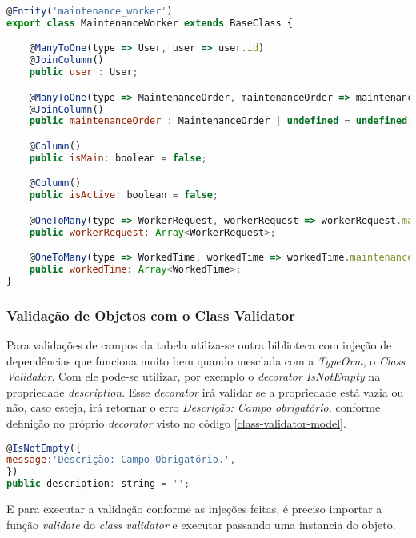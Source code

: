 \begin{lstlisting}[language=JavaScript, caption={Mapeamento de propriedades da tabela maintenance\_worker}, label={model-maintenance-worker}]
@Entity('maintenance_worker')
export class MaintenanceWorker extends BaseClass {

	@ManyToOne(type => User, user => user.id)
	@JoinColumn()
	public user : User;

	@ManyToOne(type => MaintenanceOrder, maintenanceOrder => maintenanceOrder.id, { cascade: false })
	@JoinColumn()
	public maintenanceOrder : MaintenanceOrder | undefined = undefined;

	@Column()
	public isMain: boolean = false;

	@Column()
	public isActive: boolean = false;

	@OneToMany(type => WorkerRequest, workerRequest => workerRequest.maintenanceWorker, { cascade: false })
	public workerRequest: Array<WorkerRequest>;

	@OneToMany(type => WorkedTime, workedTime => workedTime.maintenanceWorker, { cascade: false })
	public workedTime: Array<WorkedTime>;
}
\end{lstlisting}

\subsubsection{Validação de Objetos com o Class Validator}

Para validações de campos da tabela utiliza-se outra biblioteca com injeção de dependências que funciona muito bem quando mesclada com a \textit{TypeOrm}, o \textit{Class Validator}.
Com ele pode-se utilizar, por exemplo o \textit{decorator IsNotEmpty} na propriedade \textit{description}. Esse \textit{decorator} irá validar se a propriedade está vazia ou não, caso esteja, irá retornar o erro \textit{Descrição: Campo obrigatório.} conforme definição no próprio \textit{decorator} visto no código \ref{class-validator-model}.

\begin{lstlisting}[language=JavaScript, caption={Definição de validação de propriedades com o Class Validator}, label={class-validator-model}]
@IsNotEmpty({
message:'Descrição: Campo Obrigatório.',
})
public description: string = '';
\end{lstlisting}

E para executar a validação conforme as injeções feitas, é preciso importar a função \textit{validate} do \textit{class validator} e executar passando uma instancia do objeto.

